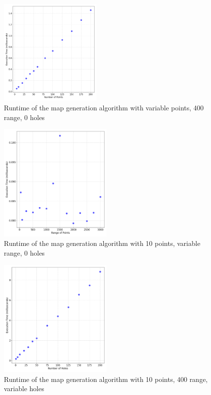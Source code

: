 \documentclass[final]{cmpreport_02}
\begin{document}
\begin{figure}[h!]
	\centering
	\includegraphics[width=0.45\textwidth]{./images/mapGenPointsRT.png}
	\caption{Runtime of the map generation algorithm with variable points, 400 range, 0 holes}
	\label{PE:mg:points}
\end{figure}


\begin{figure}[h!]
	\centering
	\includegraphics[width=0.5\textwidth]{./images/mapGenRangeRT.png}
	\caption{Runtime of the map generation algorithm with 10 points, variable range, 0 holes}

	\label{PE:mg:range}
\end{figure}

\begin{figure}[h!]
	\centering
	\includegraphics[width=0.5\textwidth]{./images/mapGenHolesRT.png}
	\caption{Runtime of the map generation algorithm with 10 points, 400 range, variable holes}
	\label{PE:mg:holes}
\end{figure}
\end{document}
